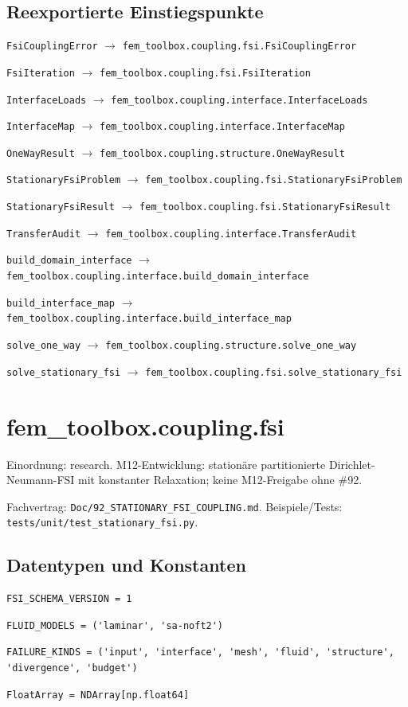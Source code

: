 \subsection*{Reexportierte Einstiegspunkte}
\noindent\nolinkurl{FsiCouplingError} $\to$ \nolinkurl{fem_toolbox.coupling.fsi.FsiCouplingError}\par
\noindent\nolinkurl{FsiIteration} $\to$ \nolinkurl{fem_toolbox.coupling.fsi.FsiIteration}\par
\noindent\nolinkurl{InterfaceLoads} $\to$ \nolinkurl{fem_toolbox.coupling.interface.InterfaceLoads}\par
\noindent\nolinkurl{InterfaceMap} $\to$ \nolinkurl{fem_toolbox.coupling.interface.InterfaceMap}\par
\noindent\nolinkurl{OneWayResult} $\to$ \nolinkurl{fem_toolbox.coupling.structure.OneWayResult}\par
\noindent\nolinkurl{StationaryFsiProblem} $\to$ \nolinkurl{fem_toolbox.coupling.fsi.StationaryFsiProblem}\par
\noindent\nolinkurl{StationaryFsiResult} $\to$ \nolinkurl{fem_toolbox.coupling.fsi.StationaryFsiResult}\par
\noindent\nolinkurl{TransferAudit} $\to$ \nolinkurl{fem_toolbox.coupling.interface.TransferAudit}\par
\noindent\nolinkurl{build_domain_interface} $\to$ \nolinkurl{fem_toolbox.coupling.interface.build_domain_interface}\par
\noindent\nolinkurl{build_interface_map} $\to$ \nolinkurl{fem_toolbox.coupling.interface.build_interface_map}\par
\noindent\nolinkurl{solve_one_way} $\to$ \nolinkurl{fem_toolbox.coupling.structure.solve_one_way}\par
\noindent\nolinkurl{solve_stationary_fsi} $\to$ \nolinkurl{fem_toolbox.coupling.fsi.solve_stationary_fsi}\par
\section{fem\_toolbox.coupling.fsi}
Einordnung: research. M12-Entwicklung: stationäre partitionierte Dirichlet-Neumann-FSI mit konstanter Relaxation; keine M12-Freigabe ohne \#92.
\par Fachvertrag: \nolinkurl{Doc/92_STATIONARY_FSI_COUPLING.md}. Beispiele/Tests:
\nolinkurl{tests/unit/test_stationary_fsi.py}.
\subsection*{Datentypen und Konstanten}
\begin{lstlisting}
FSI_SCHEMA_VERSION = 1
\end{lstlisting}
\begin{lstlisting}
FLUID_MODELS = ('laminar', 'sa-noft2')
\end{lstlisting}
\begin{lstlisting}
FAILURE_KINDS = ('input', 'interface', 'mesh', 'fluid', 'structure', 'divergence', 'budget')
\end{lstlisting}
\begin{lstlisting}
FloatArray = NDArray[np.float64]
\end{lstlisting}
